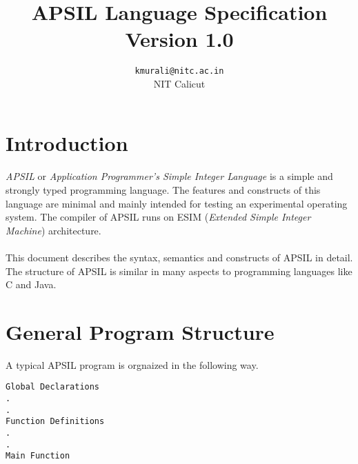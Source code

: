 \documentclass[11pt]{article}
\title{APSIL Language Specification\\
Version 1.0}
\author{\texttt{kmurali@nitc.ac.in} \\  \small {NIT Calicut} }
\begin{document}
\maketitle
\tableofcontents
\pagebreak
\section{Introduction}
\paragraph{}
\textit{APSIL} or \textit{Application Programmer's Simple Integer Language} is a simple and strongly typed programming language. The features and constructs of this language are minimal and mainly intended for testing an experimental operating system. The compiler of APSIL runs on ESIM (\textit{Extended Simple Integer Machine}) architecture.
\paragraph{}
This document describes the syntax, semantics and constructs of APSIL in detail. The structure of APSIL is similar in many aspects to programming languages like C and Java. 

\section{General Program Structure}

A typical APSIL program is orgnaized in the following way. 

\begin{verbatim}
Global Declarations
. 
. 
Function Definitions
.
. 
Main Function
\end{verbatim}
\end{document}
